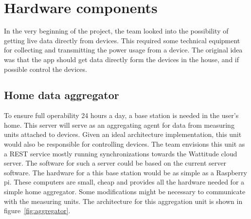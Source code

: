 \section{Hardware components}
In the very beginning of the project, the team looked into the possibility of getting live data directly from devices. This required some technical equipment for collecting and transmitting the power usage from a device. The original idea was that the app should get data directly form the devices in the house, and if possible control the devices.


\subsection{Home data aggregator}
To ensure full operability 24 hours a day, a base station is needed in the user's home. This server will serve as an aggregating agent for data from measuring units attached to devices. Given an ideal architecture implementation, this unit would also be responsible for controlling devices. The team envisions this unit as a REST service mostly running synchronizations towards the Wattitude cloud server. The software for such a server could be based on the current server software. The hardware for a this base station would be as simple as a Raspberry pi\cite{pi}. These computers are small, cheap and provides all the hardware needed for a simple home aggregator. Some modifications might be necessary to communicate with the measuring units. The architecture for this aggregation unit is shown in figure~\ref{fig:aggregator}.

